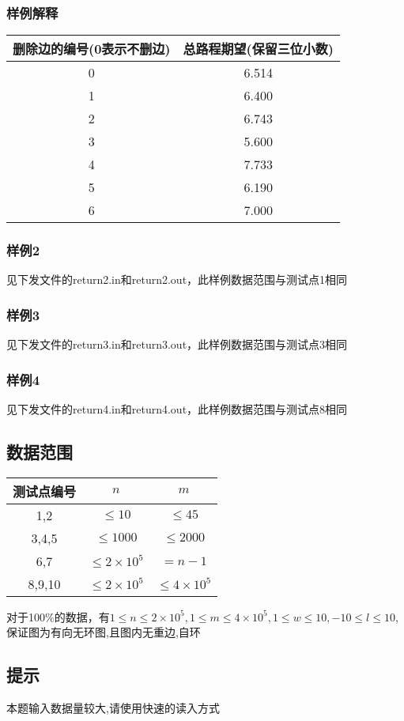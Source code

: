 \documentclass[12pt]{ctexart}
\begin{document}
\subsubsection{样例解释}
\begin{center}
	\begin{tabular}{|c|c|}
		\hline 删除边的编号(0表示不删边)&总路程期望(保留三位小数)\\
		\hline 0&6.514\\
		\hline 1&6.400\\
		\hline 2&6.743\\
		\hline 3&5.600\\
		\hline 4&7.733\\
		\hline 5&6.190\\
		\hline 6&7.000\\
		\hline
	\end{tabular}
\end{center}
\subsubsection{样例2}
见下发文件的return2.in和return2.out，此样例数据范围与测试点1相同
\subsubsection{样例3}
见下发文件的return3.in和return3.out，此样例数据范围与测试点3相同
\subsubsection{样例4}
见下发文件的return4.in和return4.out，此样例数据范围与测试点8相同
\subsection{数据范围}
\begin{center}
	\begin{tabular}{|c|c|c|}
		\hline 测试点编号&$n$&$m$\\
		\hline 1,2&$\le10$&$\le45$\\
		\hline 3,4,5&$\le1000$&$\le2000$\\
		\hline 6,7&$\le2\times10^5$&$=n-1$\\
		\hline 8,9,10&$\le2\times10^5$&$\le4\times10^5$\\
		\hline
	\end{tabular}
\end{center}
对于100\%的数据，有$1\le n\le2\times10^5,1\le m\le4\times10^5,1\le w\le10,-10\le l\le10$,保证图为有向无环图,且图内无重边,自环
\subsection{提示}
本题输入数据量较大,请使用快速的读入方式
\end{document}
